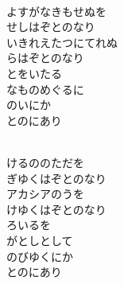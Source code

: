 \documentclass[10pt,b5j]{tarticle} %
\begin{document}
\vspace{1.5em} %
\newcommand{\linespace}{0.5em} %
\newcommand{\blocksize}{0.5\hsize} %
\newcommand{\itemmargin}{6em} %
\begin{enumerate} %
    \setlength{\itemindent}{\itemmargin} %
    \begin{minipage}[c]{\blocksize}
    
        \vspace{\linespace}
        \item~\\
        よすがなきもせぬを\\
        せしはぞとのなり\\
        いきれえたつにてれぬ\\
        らはぞとのなり\\
        とをいたる\\
        なものめぐるに\\
        のいにか\\
        とのにあり
        
        \vspace{\linespace}
        \item~\\
        けるののただを\\
        ぎゆくはぞとのなり\\
        アカシアのうを\\
        けゆくはぞとのなり\\
        ろいるを\\
        がとしとして\\
        のびゆくにか\\
        とのにあり
        

\end{minipage}
\end{enumerate}
\end{document}
